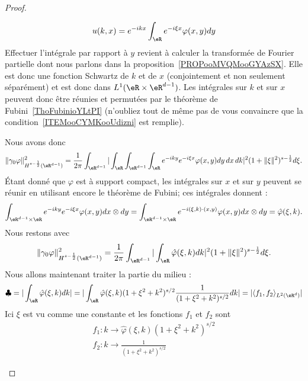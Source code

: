 \begin{proof}
\begin{subproof}
\begin{equation}
			u(k,x)= e^{-ikx}\int_{\eR} e^{-i\xi x}\varphi(x,y)dy
		\end{equation}
		Effectuer l'intégrale par rapport à $y$ revient à calculer la transformée de Fourier partielle dont nous parlons dans la proposition~\ref{PROPooMVQMooGYAzSX}. Elle est donc une fonction Schwartz de \( k\) et de \( x\) (conjointement et non seulement séparément) et est donc dans \( L^1(\eR\times \eR^{d-1})\). Les intégrales sur \( k \) et sur \( x\) peuvent donc être réunies et permutées par le théorème de Fubini~\ref{ThoFubinioYLtPI} (n'oubliez tout de même pas de vous convaincre que la condition~\ref{ITEMooCYMKooUdizni} est remplie).

		Nous avons donc
		\begin{equation}
			\| \gamma_0\varphi \|^2_{H^{s-\frac{ 1 }{2}}(\eR^{d-1})}=\frac{1}{ 2\pi }\int_{\eR^{d-1}}|\int_{\eR}\int_{\eR^{d-1}}\int_{\eR} e^{-iky} e^{-i\xi x}\varphi(x,y)dy\,dx\,dk|^2(1+\| \xi \|^2)^{s-\frac{ 1 }{2}}d\xi.
		\end{equation}
		Étant donné que \( \varphi\) est à support compact, les intégrales sur \( x\) et sur \( y\) peuvent se réunir en utilisant encore le théorème de Fubini; ces intégrales donnent :
		\begin{equation}
			\int_{\eR^{d-1}\times \eR} e^{-iky} e^{-i\xi x}\varphi(x,y)dx\otimes dy=\int_{\eR^{d-1}\times \eR} e^{  -i(\xi,k)\cdot(x,y)  }\varphi(x,y)dx\otimes dy=\hat \varphi(\xi,k).
		\end{equation}
		Nous restons avec
		\begin{equation}
			\| \gamma_0\varphi \|^2_{H^{s-\frac{ 1 }{2}}(\eR^{d-1})}=\frac{1}{ 2\pi }\int_{\eR^{d-1}}|   \int_{\eR}\hat \varphi(\xi,k)dk    |^2(1+\| \xi \|^2)^{s-\frac{ 1 }{2}}d\xi.
		\end{equation}
		Nous allons maintenant traiter la partie du milieu :
		\begin{equation}
			\clubsuit=|\int_{\eR}\hat \varphi(\xi,k)dk|=| \int_{\eR}\hat \varphi(\xi,k)(1+\xi^2+k^2)^{s/2}\frac{1}{ (1+\xi^2+k^2)^{s/2} }dk |=| \langle f_1, f_2\rangle_{L^2(\eR^d)} |
		\end{equation}
		Ici \( \xi\) est vu comme une constante et les fonctions \( f_1\) et \( f_2\) sont
		\begin{subequations}
			\begin{align}
				f_1\colon k\to \hat \varphi(\xi,k)(1+\xi^2+k^2)^{s/2} \\
				f_2\colon k\to \frac{1}{ (1+\xi^2+k^2)^{s/2} }

\end{align}
\end{subequations}
\end{subproof}
\end{proof}
